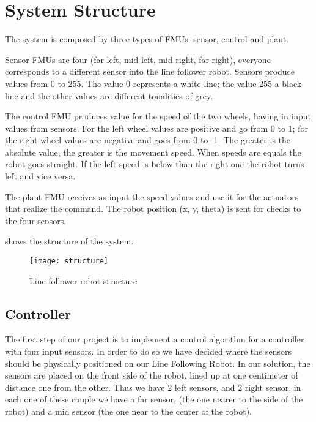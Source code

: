 \chapter{System Structure}

The system is composed by three types of FMUs: sensor, control and plant.

\begin{description}
	\item Sensor FMUs are four (far left, mid left, mid right, far right),
		everyone corresponds to a different sensor into the line
		follower robot. Sensors produce values from 0 to 255. The value
		0 represents a white line; the value 255 a black line and the
		other values are different tonalities of grey.
	\item The control FMU produces value for the speed of the two wheels,
		having in input values from sensors. For the left wheel values
		are positive and go from 0 to 1; for the right wheel values are
		negative and goes from 0 to -1. The greater is the absolute
		value, the greater is the movement speed. When speeds are equals
		the robot goes straight. If the left speed is below than the
		right one the robot turns left and vice versa.
	\item The plant FMU receives as input the speed values and use it for
		the actuators that realize the command. The robot position (x,
		y, theta) is sent for checks to the four sensors.
\end{description}

 shows the structure of the system.

\begin{figure}[htb]
	\texttt{[image: structure]}
	\caption{Line follower robot structure}\label{fig:structure}
\end{figure}

\section{Controller}

The first step of our project is to implement a control algorithm for a
controller with four input sensors. In order to do so we have decided where the
sensors should be physically positioned on our Line Following Robot. In our
solution, the sensors are placed on the front side of the robot, lined up at one
centimeter of distance one from the other. Thus we have 2 left sensors, and 2
right sensor, in each one of these couple we have a far sensor, (the one nearer
to the side of the robot) and a mid sensor (the one near to the center of the
robot).

